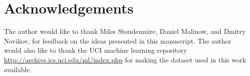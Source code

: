 \documentclass[twocolumn, prl, nofootinbib]{revtex4-1}
\begin{document}
\section{Acknowledgements}

The author would like to thank Miles Stoudenmire, Daniel Malinow, and Dmitry Novikov, for feedback on the ideas presented in this manuscript. The author would also like to thank the UCI machine learning repository \url{http://archive.ics.uci.edu/ml/index.php} for making the dataset used in this work available.

\vskip -0.2in

%


%



\vskip 0.2in
\end{document}
